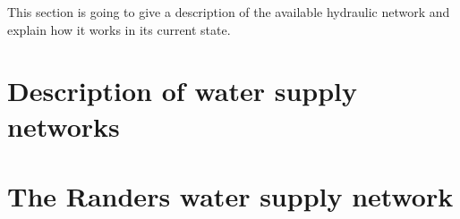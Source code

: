 This section is going to give a description of the available hydraulic network and explain how it works in its current state.   
\section{Description of water supply networks}



\section{The Randers water supply network}
